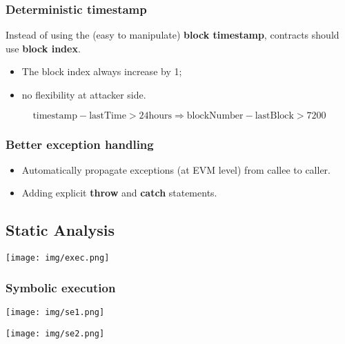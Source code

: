 \documentclass[a4paper, 10pt, titlepage]{article}
\begin{document}
\subsubsection{Deterministic timestamp}
Instead of using the (easy to manipulate) \textbf{block timestamp}, contracts should use \textbf{block index}. 
\begin{itemize}
\item The block index always increase by 1;
\item no flexibility at attacker side.
\end{itemize}
$$\text{timestamp} - \text{lastTime} > 24 \text{hours} \Rightarrow \text{blockNumber} - \text{lastBlock} > 7200$$

\subsubsection{Better exception handling}
\begin{itemize}
\item Automatically propagate exceptions (at EVM level) from callee to caller.
\item Adding explicit \textbf{throw} and \textbf{catch} statements.
\end{itemize}

\subsection{Static Analysis}
\begin{center}
\texttt{[image: img/exec.png]}
\end{center}

\subsubsection*{Symbolic execution}
\begin{flushleft}
\texttt{[image: img/se1.png]}
\end{flushleft}
\begin{flushright}
\texttt{[image: img/se2.png]}
\end{flushright}
\end{document}
